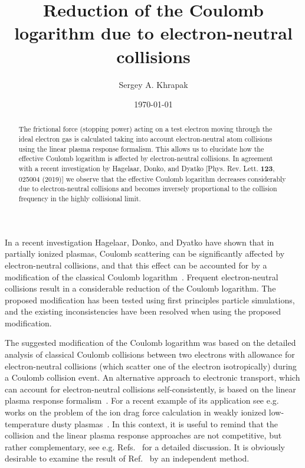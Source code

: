 \documentclass[twocolumn, 
  aps, prl,
  amsmath,amssymb,
  ]{revtex4-1}
\begin{document}
\title{\color{blue} Reduction of the Coulomb logarithm due to electron-neutral collisions}

\author{Sergey A. Khrapak}

\begin{abstract}
The frictional force (stopping power) acting on a test electron moving through the ideal electron gas is calculated taking into account electron-neutral atom collisions using the linear plasma response formalism. This allows us to elucidate how the effective Coulomb logarithm is affected by electron-neutral collisions. In agreement with a recent investigation by Hagelaar, Donko, and Dyatko [Phys. Rev. Lett. {\bf 123}, 025004 (2019)] we observe that the effective Coulomb logarithm decreases considerably due to electron-neutral collisions and becomes inversely proportional to the collision frequency in the highly collisional limit. 
\end{abstract}

\date{\today}

\maketitle

In a recent investigation Hagelaar, Donko, and Dyatko have shown that in partially ionized plasmas, Coulomb scattering can be significantly affected by electron-neutral collisions, and that this effect can be accounted for by a modification of the classical Coulomb logarithm~\cite{HagelaarPRL2019}. Frequent electron-neutral collisions result in a considerable reduction of the Coulomb logarithm. The proposed modification has been tested using first principles particle simulations, and the existing inconsistencies have been resolved when using the proposed modification.        

The suggested modification of the Coulomb logarithm was based on the detailed analysis of classical Coulomb collisions between two electrons with allowance for electron-neutral collisions (which scatter one of the electron isotropically) during a Coulomb collision event. An alternative approach to electronic transport, which can account for electron-neutral collisions self-consistently, is based on the linear plasma response formalism~\cite{NeufeldPR1955,ThompsonRMP1960}. For a recent example of its application see e.g. works on the problem of the ion drag force calculation in weakly ionized low-temperature dusty plasmas~\cite{IvlevPRL2004,IvlevPRE2005,FortovPR2005,KhrapakJAP2007}.      
In this context, it is useful to remind that the collision and the linear plasma response approaches are not competitive, but rather complementary, see e.g. Refs.~\cite{FortovPR2005,IvlevPPCF2004} for a detailed discussion. It is obviously desirable to examine the result of Ref.~\cite{HagelaarPRL2019} by an independent method.     
\end{document}
